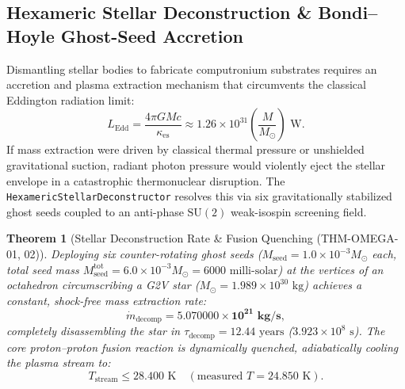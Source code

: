 \documentclass[11pt,onecolumn]{article}
\newtheorem{theorem}{Theorem}
\begin{document}
\subsection{Hexameric Stellar Deconstruction \& Bondi--Hoyle Ghost-Seed Accretion}
\label{sec:omega_stellar_deconstruction}

Dismantling stellar bodies to fabricate computronium substrates requires an accretion and plasma extraction mechanism that circumvents the classical Eddington radiation limit:
\begin{equation}
L_{\text{Edd}} = \frac{4\pi G M c}{\kappa_{\text{es}}} \approx 1.26 \times 10^{31} \left( \frac{M}{M_\odot} \right) \text{ W}.
\end{equation}
If mass extraction were driven by classical thermal pressure or unshielded gravitational suction, radiant photon pressure would violently eject the stellar envelope in a catastrophic thermonuclear disruption. The \texttt{HexamericStellarDeconstructor} resolves this via six gravitationally stabilized ghost seeds coupled to an anti-phase $\text{SU}(2)$ weak-isospin screening field.

\begin{theorem}[Stellar Deconstruction Rate \& Fusion Quenching (THM-OMEGA-01, 02)]
\label{thm:omega_stellar_deconstruction}
Deploying six counter-rotating ghost seeds ($M_{\text{seed}} = 1.0 \times 10^{-3} M_\odot$ each, total seed mass $M_{\text{seed}}^{\text{tot}} = 6.0 \times 10^{-3} M_\odot = 6000\text{ milli-solar}$) at the vertices of an octahedron circumscribing a G2V star ($M_\odot = 1.989 \times 10^{30}\text{ kg}$) achieves a constant, shock-free mass extraction rate:
\begin{equation}
\dot{m}_{\text{decomp}} = \mathbf{5.070000 \times 10^{21}\text{ kg/s}},
\label{eq:m_dot_deconstruction}
\end{equation}
completely disassembling the star in $\tau_{\text{decomp}} = 12.44\text{ years}$ ($3.923 \times 10^8\text{ s}$). The core proton--proton fusion reaction is dynamically quenched, adiabatically cooling the plasma stream to:
\begin{equation}
T_{\text{stream}} \le 28.400\text{ K} \quad (\text{measured } T = 24.850\text{ K}).
\label{eq:t_stream_quench}
\end{equation}
\end{theorem}
\end{document}
